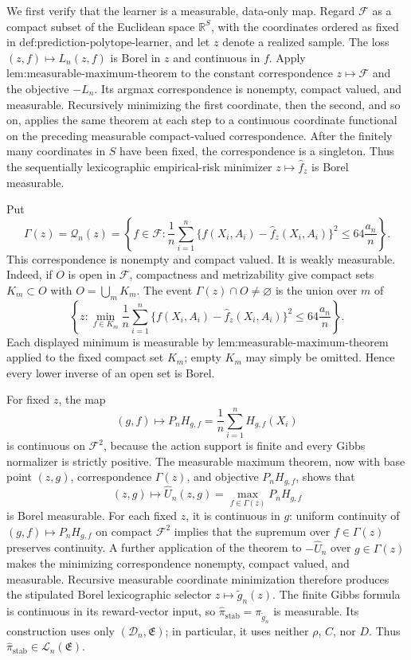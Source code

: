 We first verify that the learner is a measurable, data-only map. Regard \(\mathcal F\) as a compact subset of the Euclidean space \(\mathbb R^S\), with the coordinates ordered as fixed in \(\text{def:prediction-polytope-learner}\), and let \(z\) denote a realized sample. The loss \((z,f)\mapsto L_n(z,f)\) is Borel in \(z\) and continuous in \(f\). Apply \(\text{lem:measurable-maximum-theorem}\) to the constant correspondence \(z\mapsto\mathcal F\) and the objective \(-L_n\). Its argmax correspondence is nonempty, compact valued, and measurable. Recursively minimizing the first coordinate, then the second, and so on, applies the same theorem at each step to a continuous coordinate functional on the preceding measurable compact-valued correspondence. After the finitely many coordinates in \(S\) have been fixed, the correspondence is a singleton. Thus the sequentially lexicographic empirical-risk minimizer \(z\mapsto\widehat f_z\) is Borel measurable.

Put
\[
\Gamma(z)=\mathcal Q_n(z)
=\left\{f\in\mathcal F:\frac1n\sum_{i=1}^n\{f(X_i,A_i)-\widehat f_z(X_i,A_i)\}^2\le64\frac{a_n}{n}\right\}.
\]
This correspondence is nonempty and compact valued. It is weakly measurable. Indeed, if \(O\) is open in \(\mathcal F\), compactness and metrizability give compact sets \(K_m\subset O\) with \(O=\bigcup_mK_m\). The event \(\Gamma(z)\cap O\ne\varnothing\) is the union over \(m\) of
\[
\left\{z:\min_{f\in K_m}\frac1n\sum_{i=1}^n\{f(X_i,A_i)-\widehat f_z(X_i,A_i)\}^2\le64\frac{a_n}{n}\right\}.
\]
Each displayed minimum is measurable by \(\text{lem:measurable-maximum-theorem}\) applied to the fixed compact set \(K_m\); empty \(K_m\) may simply be omitted. Hence every lower inverse of an open set is Borel.

For fixed \(z\), the map
\[
(g,f)\longmapsto P_nH_{g,f}=\frac1n\sum_{i=1}^nH_{g,f}(X_i)
\]
is continuous on \(\mathcal F^2\), because the action support is finite and every Gibbs normalizer is strictly positive. The measurable maximum theorem, now with base point \((z,g)\), correspondence \(\Gamma(z)\), and objective \(P_nH_{g,f}\), shows that
\[
(z,g)\longmapsto\widehat U_n(z,g)=\max_{f\in\Gamma(z)}P_nH_{g,f}
\]
is Borel measurable. For each fixed \(z\), it is continuous in \(g\): uniform continuity of \((g,f)\mapsto P_nH_{g,f}\) on compact \(\mathcal F^2\) implies that the supremum over \(f\in\Gamma(z)\) preserves continuity. A further application of the theorem to \(-\widehat U_n\) over \(g\in\Gamma(z)\) makes the minimizing correspondence nonempty, compact valued, and measurable. Recursive measurable coordinate minimization therefore produces the stipulated Borel lexicographic selector \(z\mapsto\widetilde g_n(z)\). The finite Gibbs formula is continuous in its reward-vector input, so \(\widehat\pi_{\mathrm{stab}}=\pi_{\widetilde g_n}\) is measurable. Its construction uses only \((\mathcal D_n,\mathfrak E)\); in particular, it uses neither \(\rho\), \(C\), nor \(D\). Thus \(\widehat\pi_{\mathrm{stab}}\in\mathcal L_n(\mathfrak E)\).


